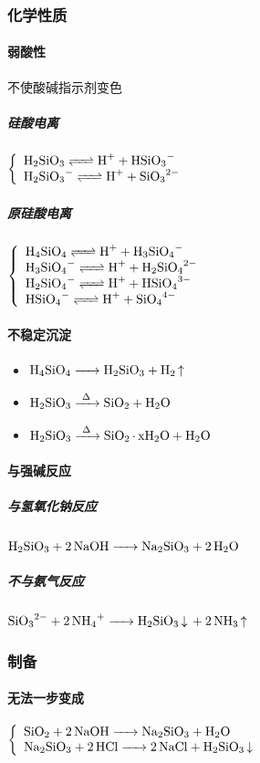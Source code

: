 \documentclass[a4paper]{article}
\begin{document}
	\subsubsection{化学性质}
	\paragraph{弱酸性}
	不使酸碱指示剂变色
	\subparagraph{硅酸电离}
	$\left\{\begin{array}{lr}
		\ce{H2SiO3 <=> H+ + HSiO3-}\\
		\ce{H2SiO3- <=> H+ + SiO3^2-}\\
	\end{array}\right.$
	\subparagraph{原硅酸电离}
	$\left\{\begin{array}{lr}
		\ce{H4SiO4 <=> H+ + H3SiO4-}\\
		\ce{H3SiO4- <=> H+ + H2SiO4^2-}\\
		\ce{H2SiO4- <=> H+ + HSiO4^3-}\\
		\ce{HSiO4- <=> H+ + SiO4^4-}\\
	\end{array}\right.$
	\paragraph{不稳定沉淀}
	\begin{itemize}
		\item $\ce{H4SiO4 -> H2SiO3 + H2 ^}$
		\item $\ce{H2SiO3 ->[\Delta] SiO2 + H2O}$
		\item $\ce{H2SiO3 ->[\Delta] SiO2*xH2O + H2O}$
	\end{itemize}
	\paragraph{与强碱反应}
	\subparagraph{与氢氧化钠反应}
	$\ce{H2SiO3 + 2NaOH -> Na2SiO3 + 2H2O}$
	\subparagraph{不与氨气反应}
	$\ce{SiO3^2- + 2NH4+ -> H2SiO3 v + 2NH3 ^}$
	\subsubsection{制备}
	\paragraph{无法一步变成}
	$\left\{\begin{array}{lr}
		\ce{SiO2 + 2NaOH -> Na2SiO3 + H2O}\\
		\ce{Na2SiO3 + 2HCl -> 2NaCl + H2SiO3 v}\\
	\end{array}\right.$
	
\end{document}
